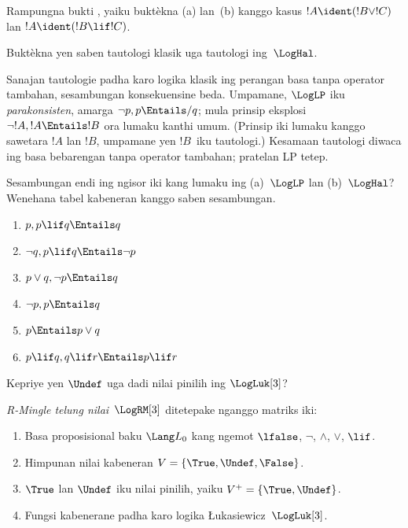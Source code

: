 \documentclass[../../../include/open-logic-section]{subfiles}
\begin{document}
\begin{prob}
  Rampungna bukti , yaiku
  buktèkna (a) lan~(b) kanggo kasus $!A \ident (!B \lor !C)$
  lan $!A \ident (!B \lif !C)$.
\end{prob}

\begin{prob}
Buktèkna yen saben tautologi klasik uga tautologi ing~$\LogHal$.
\end{prob}

Sanajan tautologie padha karo logika klasik ing perangan basa
tanpa operator tambahan, sesambungan konsekuensine beda. Umpamane,
$\LogLP$ iku \emph{parakonsisten}, amarga $\lnot p, p \Entails/ q$;
mula prinsip eksplosi $\lnot !A, !A \Entails !B$ ora lumaku kanthi
umum. (Prinsip iki lumaku kanggo sawetara $!A$ lan $!B$, umpamane
yen $!B$~iku tautologi.) Kesamaan tautologi diwaca ing basa bebarengan tanpa operator tambahan; pratelan LP tetep.

\begin{prob}
  Sesambungan endi ing ngisor iki kang lumaku ing (a)~$\LogLP$
  lan (b)~$\LogHal$? Wenehana tabel kabeneran kanggo saben
  sesambungan.
  \begin{enumerate}
    \item $p, p \lif q \Entails q$
    \item $\lnot q, p \lif q \Entails \lnot p$
    \item $p \lor q, \lnot p \Entails q$
    \item $\lnot p, p \Entails q$
    \item $p \Entails p \lor q$
    \item $p \lif q, q\lif r \Entails p \lif r$
  \end{enumerate}
\end{prob}

Kepriye yen $\Undef$ uga dadi nilai pinilih ing $\LogLuk[3]$?

\begin{defn}
  \emph{R-Mingle telung nilai}~$\LogRM[3]$ ditetepake nganggo matriks iki:
  \begin{enumerate}
    \item Basa proposisional baku $\Lang L_0$ kang ngemot
    $\lfalse$, $\lnot$, $\land$, $\lor$, $\lif$.
    \item Himpunan nilai kabeneran $V = \{\True, \Undef, \False\}$.
    \item $\True$ lan $\Undef$ iku nilai pinilih, yaiku $V^+ = \{\True, \Undef\}$.
    \item Fungsi kabenerane padha karo logika \L ukasiewicz~$\LogLuk[3]$.
  \end{enumerate}
\end{defn}
\end{document}
